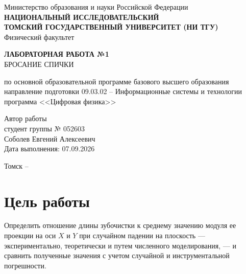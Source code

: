 \documentclass[a4paper, 14pt]{extarticle}
\begin{document}
\thispagestyle{empty}

\begin{center}
  Министерство образования и науки Российской Федерации\\[0.5em]
  \textbf{НАЦИОНАЛЬНЫЙ ИССЛЕДОВАТЕЛЬСКИЙ}\\
  \textbf{ТОМСКИЙ ГОСУДАРСТВЕННЫЙ УНИВЕРСИТЕТ (НИ ТГУ)}\\[0.3em]
  Физический факультет\\

  \vspace{4cm}

  \textbf{\Large ЛАБОРАТОРНАЯ РАБОТА №1}\\[1em]
  {\Large БРОСАНИЕ СПИЧКИ}

  \vspace{2cm}

  по основной образовательной программе базового высшего образования\\
  направление подготовки 09.03.02 -- Информационные системы и технологии\\
  программа <<Цифровая физика>>

  \vfill

  \begin{flushright}
    \begin{minipage}{7cm}
      Автор работы\\
      студент группы № 052603\\
      Соболев Евгений Алексеевич\\[0.5em]
      Дата выполнения: 07.09.2026
    \end{minipage}
  \end{flushright}

  \vfill

  Томск -- \the\year
\end{center}

\newpage

\setcounter{page}{2}

\tableofcontents

\newpage

\section*{Цель работы}

Определить отношение длины зубочистки к среднему значению модуля ее проекции
на оси $X$ и $Y$ при случайном падении на плоскость --- экспериментально,
теоретически и путем численного моделирования, --- и сравнить полученные значения
с учетом случайной и инструментальной погрешности.
\end{document}
